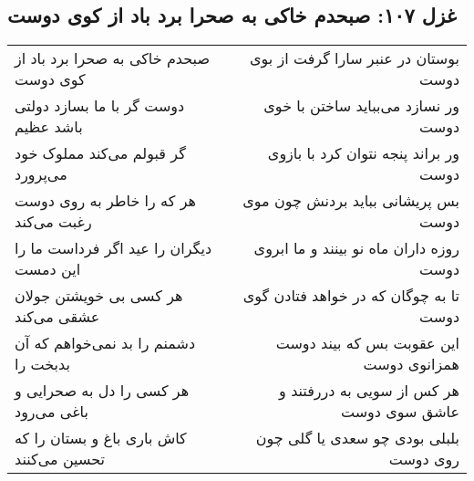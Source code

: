 \begin{center}
\section*{غزل ۱۰۷: صبحدم خاکی به صحرا برد باد از کوی دوست}
\label{sec:107}
\begin{longtable}{l p{0.5cm} r}
صبحدم خاکی به صحرا برد باد از کوی دوست
&&
بوستان در عنبر سارا گرفت از بوی دوست
\\
دوست گر با ما بسازد دولتی باشد عظیم
&&
ور نسازد می‌بباید ساختن با خوی دوست
\\
گر قبولم می‌کند مملوک خود می‌پرورد
&&
ور براند پنجه نتوان کرد با بازوی دوست
\\
هر که را خاطر به روی دوست رغبت می‌کند
&&
بس پریشانی بباید بردنش چون موی دوست
\\
دیگران را عید اگر فرداست ما را این دمست
&&
روزه داران ماه نو بینند و ما ابروی دوست
\\
هر کسی بی خویشتن جولان عشقی می‌کند
&&
تا به چوگان که در خواهد فتادن گوی دوست
\\
دشمنم را بد نمی‌خواهم که آن بدبخت را
&&
این عقوبت بس که بیند دوست همزانوی دوست
\\
هر کسی را دل به صحرایی و باغی می‌رود
&&
هر کس از سویی به دررفتند و عاشق سوی دوست
\\
کاش باری باغ و بستان را که تحسین می‌کنند
&&
بلبلی بودی چو سعدی یا گلی چون روی دوست
\\
\end{longtable}
\end{center}
